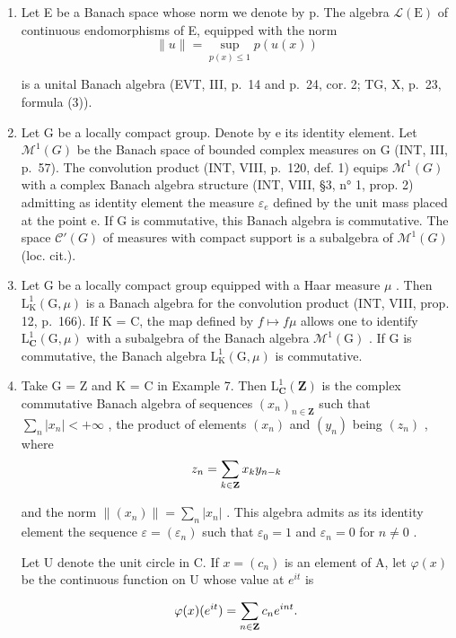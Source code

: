 \begin{enumerate}
\item
  Let E be a Banach space whose norm we denote by p. The algebra \(\mathcal{L}(\mathrm{E})\) of continuous endomorphisms of E, equipped with the norm
\[
\| u \| = \sup _ {p (x) \leqslant 1} p (u (x))
\]

is a unital Banach algebra (EVT, III, p.~14 and p.~24, cor. 2; TG, X, p.~23, formula (3)).

\item
  Let G be a locally compact group. Denote by e its identity element. Let \(\mathcal{M}^{1}(G)\) be the Banach space of bounded complex measures on G (INT, III, p.~57). The convolution product (INT, VIII, p.~120, def. 1) equips \(\mathcal{M}^{1}(G)\) with a complex Banach algebra structure (INT, VIII, §3, n° 1, prop. 2) admitting as identity element the measure \(\varepsilon_{e}\) defined by the unit mass placed at the point e. If G is commutative, this Banach algebra is commutative. The space \(\mathcal{C}'(G)\) of measures with compact support is a subalgebra of \(\mathcal{M}^{1}(G)\) (loc. cit.).
\item
  Let G be a locally compact group equipped with a Haar measure \(\mu\) . Then \(\mathrm{L}_{\mathrm{K}}^{1}(\mathrm{G},\mu)\) is a Banach algebra for the convolution product (INT, VIII, prop. 12, p.~166). If K = C, the map defined by \(f \mapsto f \mu\) allows one to identify \(\mathrm{L}_{\mathbf{C}}^{1}(\mathrm{G},\mu)\) with a subalgebra of the Banach algebra \(\mathcal{M}^{1}(\mathrm{G})\) .
If G is commutative, the Banach algebra \(\mathrm{L}_{\mathrm{K}}^{1}(\mathrm{G},\mu)\) is commutative.

\item
  Take G = Z and K = C in Example 7. Then \(\mathrm{L}_{\mathbf{C}}^{1}(\mathbf{Z})\) is the complex commutative Banach algebra of sequences \((x_{n})_{n\in\mathbf{Z}}\) such that \(\sum_{n}|x_{n}|<+\infty\) , the product of elements \((x_{n})\) and \((y_{n})\) being \((z_{n})\) , where
\[
z _ {n} = \sum_ {k \in {\bf Z}} x _ {k} y _ {n - k}
\]

and the norm \(\|(x_{n})\|=\sum_{n}|x_{n}|\) . This algebra admits as its identity element the sequence \(\varepsilon=(\varepsilon_{n})\) such that \(\varepsilon_{0}=1\) and \(\varepsilon_{n}=0\) for \(n\neq0\) .

Let U denote the unit circle in C. If \(x = (c_{n})\) is an element of A, let \(\varphi(x)\) be the continuous function on U whose value at \(e^{it}\) is

\[
\varphi (x) (e ^ {i t}) = \sum_ {n \in {\bf Z}} c _ {n} e ^ {i n t}.
\]


\end{enumerate}
